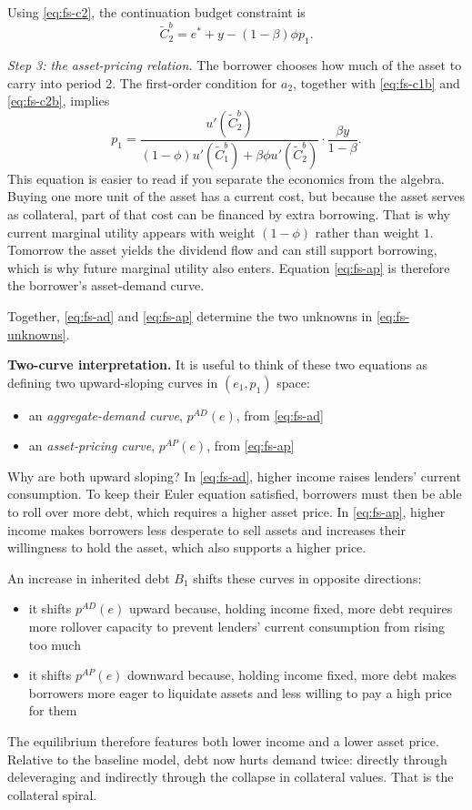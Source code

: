\documentclass[11pt,a4paper]{article}
\begin{document}
Using \eqref{eq:fs-c2}, the continuation budget constraint is
\begin{equation}\label{eq:fs-c2b}
\tilde{C}_2^b = e^* + y - (1-\beta)\phi p_1.
\end{equation}

\textit{Step 3: the asset-pricing relation.} The borrower chooses how much of the asset to carry into period 2. The first-order condition for $a_2$, together with \eqref{eq:fs-c1b} and \eqref{eq:fs-c2b}, implies
\begin{equation}\label{eq:fs-ap}
p_1
=
\frac{u'(\tilde{C}_2^b)}
{(1-\phi)u'(\tilde{C}_1^b)+\beta\phi u'(\tilde{C}_2^b)}
\cdot
\frac{\beta y}{1-\beta}.
\end{equation}
This equation is easier to read if you separate the economics from the algebra. Buying one more unit of the asset has a current cost, but because the asset serves as collateral, part of that cost can be financed by extra borrowing. That is why current marginal utility appears with weight $(1-\phi)$ rather than weight $1$. Tomorrow the asset yields the dividend flow and can still support borrowing, which is why future marginal utility also enters. Equation \eqref{eq:fs-ap} is therefore the borrower's asset-demand curve.

Together, \eqref{eq:fs-ad} and \eqref{eq:fs-ap} determine the two unknowns in \eqref{eq:fs-unknowns}.

\textbf{Two-curve interpretation.} It is useful to think of these two equations as defining two upward-sloping curves in $(e_1,p_1)$ space:
\begin{itemize}
    \item an \textit{aggregate-demand curve}, $p^{AD}(e)$, from \eqref{eq:fs-ad}
    \item an \textit{asset-pricing curve}, $p^{AP}(e)$, from \eqref{eq:fs-ap}
\end{itemize}
Why are both upward sloping? In \eqref{eq:fs-ad}, higher income raises lenders' current consumption. To keep their Euler equation satisfied, borrowers must then be able to roll over more debt, which requires a higher asset price. In \eqref{eq:fs-ap}, higher income makes borrowers less desperate to sell assets and increases their willingness to hold the asset, which also supports a higher price.

An increase in inherited debt $B_1$ shifts these curves in opposite directions:
\begin{itemize}
    \item it shifts $p^{AD}(e)$ upward because, holding income fixed, more debt requires more rollover capacity to prevent lenders' current consumption from rising too much
    \item it shifts $p^{AP}(e)$ downward because, holding income fixed, more debt makes borrowers more eager to liquidate assets and less willing to pay a high price for them
\end{itemize}
The equilibrium therefore features both lower income and a lower asset price. Relative to the baseline model, debt now hurts demand twice: directly through deleveraging and indirectly through the collapse in collateral values. That is the collateral spiral.
\end{document}
